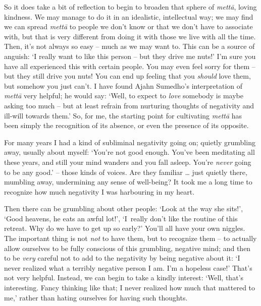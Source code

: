 So it does take a bit of reflection to begin to broaden that sphere of \textit{mett\=a}, loving kindness. We may manage to do it in an idealistic, intellectual way; we may find we can spread \textit{mett\=a} to people we don't know or that we don't have to associate with, but that is very different from doing it with those we live with all the time. Then, it's not always so easy -- much as we may want to. This can be a source of anguish: `I really want to like this person -- but they drive me nuts!' I'm sure you have all experienced this with certain people. You may even feel sorry for them -- but they still drive you nuts! You can end up feeling that you \textit{should} love them, but somehow you just can't. I have found Ajahn Sumedho's interpretation of \textit{mett\=a} very helpful; he would say: `Well, to expect to \textit{love} somebody is maybe asking too much -- but at least refrain from nurturing thoughts of negativity and ill-will towards them.' So, for me, the starting point for cultivating \textit{mett\=a} has been simply the recognition of its absence, or even the presence of its opposite. 

For many years I had a kind of subliminal negativity going on; quietly grumbling away, usually about myself: `You're not good enough. You've been meditating all these years, and still your mind wanders and you fall asleep. You're \textit{never} going to be any good.' -- those kinds of voices. Are they familiar \ldots{} just quietly there, mumbling away, undermining any sense of well-being? It took me a long time to recognize how much negativity I was harbouring in my heart.

Then there can be grumbling about other people: `Look at the way she sits!', `Good heavens, he eats an awful lot!', \mbox{`I really} don't like the routine of this retreat. Why do we have to get up so early?' You'll all have your own niggles. The important thing is not \textit{not} to have them, but to recognize them -- to actually allow ourselves to be fully conscious of this grumbling, negative mind; and then to be \textit{very} careful not to add to the negativity by being negative about it: `I never realized what a terribly negative person I am. I'm a hopeless case!' That's not very helpful. Instead, we can begin to take a kindly interest: `Well, that's interesting. Fancy thinking like that; I never realized how much that mattered to me,' rather than hating ourselves for having such thoughts. 

